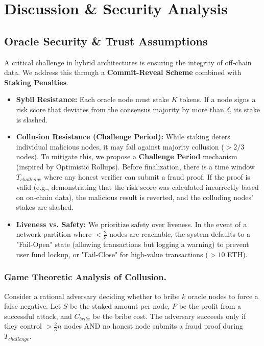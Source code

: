 \section{Discussion & Security Analysis}

\subsection{Oracle Security & Trust Assumptions}
A critical challenge in hybrid architectures is ensuring the integrity of off-chain data. We address this through a \textbf{Commit-Reveal Scheme} combined with \textbf{Staking Penalties}.
\begin{itemize}
    \item \textbf{Sybil Resistance:} Each oracle node must stake $K$ tokens. If a node signs a risk score that deviates from the consensus majority by more than $\delta$, its stake is slashed.
    \item \textbf{Collusion Resistance (Challenge Period):} While staking deters individual malicious nodes, it may fail against majority collusion ($>2/3$ nodes). To mitigate this, we propose a \textbf{Challenge Period} mechanism (inspired by Optimistic Rollups). Before finalization, there is a time window $T_{challenge}$ where any honest verifier can submit a fraud proof. If the proof is valid (e.g., demonstrating that the risk score was calculated incorrectly based on on-chain data), the malicious result is reverted, and the colluding nodes' stakes are slashed.
    \item \textbf{Liveness vs. Safety:} We prioritize safety over liveness. In the event of a network partition where $< \frac{2}{3}$ nodes are reachable, the system defaults to a "Fail-Open" state (allowing transactions but logging a warning) to prevent user fund lockup, or "Fail-Close" for high-value transactions ($>10$ ETH).
\end{itemize}

\subsubsection{Game Theoretic Analysis of Collusion.}
Consider a rational adversary deciding whether to bribe $k$ oracle nodes to force a false negative. Let $S$ be the staked amount per node, $P$ be the profit from a successful attack, and $C_{bribe}$ be the bribe cost. The adversary succeeds only if they control $> \frac{2}{3}n$ nodes AND no honest node submits a fraud proof during $T_{challenge}$.

